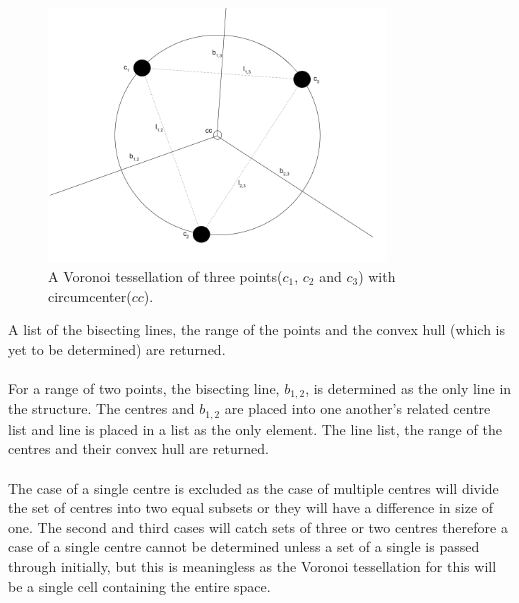 \begin{figure}[H]
\centering
\includegraphics[width=0.8\textwidth]{Images/vor_triangle.png}
\caption{A Voronoi tessellation of three points($c_1$, $c_2$ and $c_3$) with circumcenter($cc$).}
\label{fig:vor_triangle}
\end{figure}
A list of the bisecting lines, the range of the points and the convex hull (which is yet to be determined) are returned.
\\
\\
For a range of two points, the bisecting line, $b_{1,2}$, is determined as the only line in the structure. The centres and $b_{1,2}$ are placed into one another's related centre list and line is placed in a list as the only element. The line list, the range of the centres and their convex hull are returned.
\\
\\
The case of a single centre is excluded as the case of multiple centres will divide the set of centres into two equal subsets or they will have a difference in size of one. The second and third cases will catch sets of three or two centres therefore a case of a single centre cannot be determined unless a set of a single is passed through initially, but this is meaningless as the Voronoi tessellation for this will be a single cell containing the entire space.

